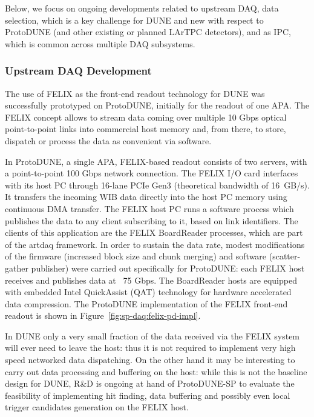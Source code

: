 Below, we focus on ongoing developments related to upstream DAQ,
data selection, which is a key challenge for DUNE and new with respect
to ProtoDUNE (and other existing or planned LArTPC detectors),
and as IPC, which is common across multiple DAQ subsystems.


\subsubsection{Upstream DAQ Development}

The use of FELIX as the front-end readout technology for DUNE was
successfully prototyped on ProtoDUNE, initially for the readout of one
APA. The FELIX concept allows to stream data coming over multiple 10
Gbps optical point-to-point links into commercial host memory and,
from there, to store, dispatch or process the data as convenient via
software. 

In ProtoDUNE, a single APA,  FELIX-based readout consists of two servers,
with a point-to-point 100 Gbps network connection.
The FELIX I/O card
interfaces with its host PC through 16-lane PCIe Gen3 (theoretical bandwidth of \SI{16}{GB/s}).
It transfers
the incoming WIB data directly into the host PC memory using
continuous DMA transfer. The FELIX host PC runs a software process
which publishes the data to any client subscribing to it, based on
link identifiers. The clients of this application are the FELIX
BoardReader processes, which are part of the artdaq framework. In
order to sustain the data rate, modest modifications of the firmware
(increased block size and chunk merging) and software (scatter-gather
publisher) were carried out specifically for ProtoDUNE: each FELIX
host receives and publishes data at ~75 Gbps. The BoardReader hosts
are equipped with embedded Intel QuickAssist (QAT) \cite{qat} technology for
hardware accelerated data compression. The ProtoDUNE implementation of
the FELIX front-end readout is
shown in Figure~\ref{fig:sp-daq:felix-pd-impl}.

In DUNE only a very small fraction of the data received via the FELIX
system will ever need to leave the host: thus it is not required to
implement very high speed networked data dispatching. On the other
hand it may be interesting to carry out data processing and buffering
on the host: while this is not the baseline design for DUNE, R\&D is
ongoing at hand of ProtoDUNE-SP to evaluate the feasibility of
implementing hit finding, data buffering and possibly even local
trigger candidates generation on the FELIX host. 

